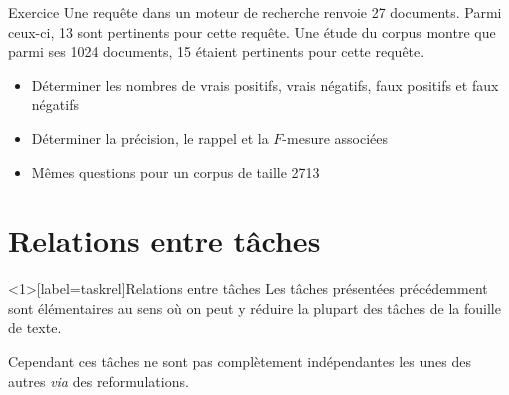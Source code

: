 \documentclass[xcolor={svgnames}, french]{beamer}
\begin{document}
\begin{frame}{Exercice}
	Une requête dans un moteur de recherche renvoie \num{27} documents. Parmi ceux-ci, \num{13} sont pertinents pour cette requête. Une étude du corpus montre que parmi ses \num{1024} documents, \num{15} étaient pertinents pour cette requête.
	\begin{itemize}
		\item Déterminer les nombres de vrais positifs, vrais négatifs, faux positifs et faux négatifs
		\item Déterminer la précision, le rappel et la $F$-mesure associées
		\item Mêmes questions pour un corpus de taille \num{2713}
	\end{itemize}
\end{frame}



\section{Relations entre tâches}
\begin{frame}<1>[label=taskrel]{Relations entre tâches}
	Les tâches présentées précédemment sont \alert{élémentaires} au sens où on peut y \alert{réduire} la plupart des tâches de la fouille de texte.

	Cependant ces tâches ne sont pas complètement indépendantes les unes des autres \emph{via} des \alert{reformulations}.
\end{frame}
\end{document}
